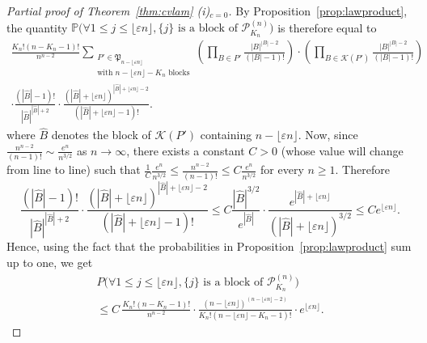 \documentclass[10pt]{amsart}
\theoremstyle{definition}\newtheorem{defi}[theo]{Definition}\newtheorem{rema}[theo]{Remark}\newtheorem{exam}[theo]{Example}\newtheorem{exem}[theo]{Example}\newtheorem{nota}[theo]{Notation}
\renewcommand{\P}{\mathbb{P}}
\def\PPP{\mathcal P}
\renewcommand{\epsilon}{\varepsilon}
\begin{document}
\begin{proof}[Partial proof of Theorem~\ref{thm:cvlam} (i)$_{c=0}$]
By  Proposition~\ref{prop:lawproduct}, the quantity $\P \big( \forall 1 \leq j \leq \lfloor \epsilon n \rfloor, \{j\} \textrm{ is a block of } \PPP^{(n)}_{K_{n}}  \big)$ is therefore equal to
\begin{multline*}
  \frac{K_{n}! (n-K_{n}-1)!}{n^{n-2}}  \sum_{\substack{P' \in \mathfrak{P}_{n- \lfloor \epsilon n \rfloor} \\  \textrm{with } n- \lfloor \epsilon n \rfloor-K_{n} \textrm{ blocks}}}  \left( \prod_{B \in P'} \frac{|B|^{|B|-2}}{(|B|-1)!} \right) \cdot \left(  \prod_{B \in  \mathcal{K}(P')} \frac{|B|^{|B|-2}}{(|B|-1)!} \right) \\
  \cdot  \frac{(|\hat{B}|-1)!}{|\hat{B}|^{|\hat{B}|+2}} \cdot\frac{(|\hat{B}|+\lfloor \epsilon n \rfloor)^{|\hat{B}|+\lfloor \epsilon n \rfloor-2}}{(|\hat{B}|+\lfloor \epsilon n \rfloor-1)!}.
\end{multline*}
where $\hat{B}$ denotes the block of $\mathcal{K}(P')$ containing $n- \lfloor \epsilon n \rfloor$. Now, since $ \frac{n^{n-2}}{(n-1)!} \sim  \tfrac{e^{n}}{n^{3/2}}$ as $ n \rightarrow \infty$, there exists a constant $C>0$ (whose value will change from line to line) such that $ \tfrac{1}{C}  \tfrac{e^{n}}{n^{3/2}} \leq  \frac{n^{n-2}}{(n-1)!}  \leq C  \tfrac{e^{n}}{n^{3/2}}$ for every $n \geq 1$.  Therefore
\[
 \frac{(|\hat{B}|-1)!}{|\hat{B}|^{|\hat{B}|+2}} \cdot\frac{(|\hat{B}|+\lfloor \epsilon n \rfloor)^{|\hat{B}|+\lfloor \epsilon n \rfloor-2}}{(|\hat{B}|+\lfloor \epsilon n \rfloor-1)!} \leq   C \frac{|\hat{B}|^{3/2}}{e^{|\hat{B}|}} \cdot  \frac{e^{|\hat{B}|+\lfloor \epsilon n \rfloor}}{(|\hat{B}|+\lfloor \epsilon n \rfloor)^{3/2}} \leq C e^{\lfloor \epsilon n \rfloor}.
\]
Hence, using the fact that the probabilities in Proposition~\ref{prop:lawproduct} sum up to one, we get
\begin{multline*}
  P \big( \forall 1 \leq j \leq \lfloor \epsilon n \rfloor, \{j\} \textrm{ is a block of } \PPP^{(n)}_{K_{n}}  \big) \\
  \leq  C  \, \frac{K_{n}! (n-K_{n}-1)!}{n^{n-2}} \cdot \frac{(n-\lfloor \epsilon n \rfloor)^{(n-\lfloor \epsilon n \rfloor-2)}}{K_{n}! (n-\lfloor \epsilon n \rfloor  -K_{n}-1)!} \cdot e^{\lfloor \epsilon n \rfloor}.
\end{multline*}


\end{proof}
\end{document}
